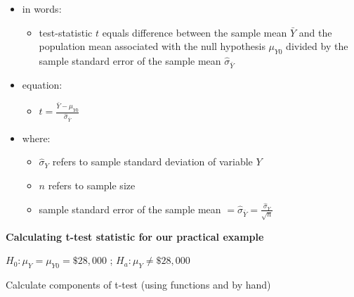 \documentclass[
  letterpaper,
  DIV=11,
  numbers=noendperiod]{scrartcl}
\providecommand{\tightlist}{%
  \setlength{\itemsep}{0pt}\setlength{\parskip}{0pt}}\usepackage{longtable,booktabs,array}
\begin{document}
\begin{itemize}
\tightlist
\item
  in words:

  \begin{itemize}
  \tightlist
  \item
    test-statistic \(t\) equals difference between the sample mean
    \(\bar{Y}\) and the population mean associated with the null
    hypothesis \(\mu_{Y0}\) divided by the sample standard error of the
    sample mean \(\hat{\sigma}_{\bar{Y}}\)
  \end{itemize}
\item
  equation:

  \begin{itemize}
  \tightlist
  \item
    \(t = \frac{\bar{Y} - \mu_{Y0}}{\hat{\sigma}_{\bar{Y}}}\)
  \end{itemize}
\item
  where:

  \begin{itemize}
  \tightlist
  \item
    \(\hat{\sigma}_{Y}\) refers to sample standard deviation of variable
    \(Y\)
  \item
    \(n\) refers to sample size
  \item
    sample standard error of the sample mean
    \(= \hat{\sigma}_{\bar{Y}} = \frac{\hat{\sigma}_{Y}}{\sqrt{n}}\)
  \end{itemize}
\end{itemize}

\textbf{Calculating t-test statistic for our practical example}

\(H_0: \mu_Y = \mu_{Y0} = \$28,000\) ; \(H_a: \mu_Y \ne \$28,000\)

Calculate components of t-test (using functions and by hand)
\end{document}
